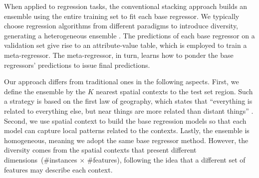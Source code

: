 \documentclass[runningheads]{llncs}
\begin{document}

When applied to regression tasks, the conventional stacking approach builds an ensemble using the entire training set to fit each base regressor. We typically choose regression algorithms from different paradigms to introduce diversity, generating a heterogeneous ensemble \cite{dietterich2000ensemble}. The predictions of each base regressor on a validation set give rise to an attribute-value table, which is employed to train a meta-regressor. The meta-regressor, in turn, learns how to ponder the base regressors' predictions to issue final predictions.

Our approach differs from traditional ones in the following aspects. First, we define the ensemble by the $K$ nearest spatial contexts to the test set region. Such a strategy is based on the first law of geography, which states that ``everything is related to everything else, but near things are more related than distant things'' \cite{tobler1970computer}. Second, we use spatial context to build the base regression models so that each model can capture local patterns related to the contexts. Lastly, the ensemble is homogeneous, meaning we adopt the same base regressor method. However, the diversity comes from the spatial contexts that present different dimensions~(\#instances $\times$ \#features), following the idea that a different set of features may describe each context.
\end{document}
